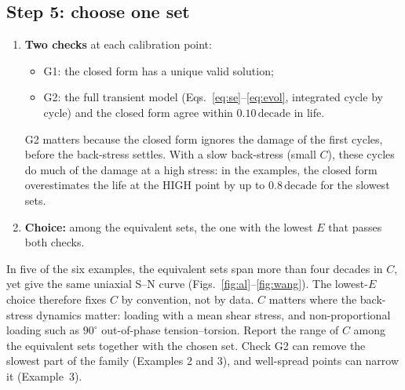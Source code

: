 \documentclass[11pt,a4paper]{article}
\newcommand{\dec}{\,\text{decade}}
\begin{document}
\subsection*{Step 5: choose one set}
\begin{enumerate}[label=(\alph*)]
\item \textbf{Two checks} at each calibration point:
  \begin{itemize}
  \item G1: the closed form has a unique valid solution;
  \item G2: the full transient model (Eqs.~\ref{eq:se}--\ref{eq:evol}, integrated cycle by cycle) and the closed form
    agree within $0.10\dec$ in life.
  \end{itemize}
  G2 matters because the closed form ignores the damage of the first cycles, before the back-stress settles. With a
  slow back-stress (small $C$), these cycles do much of the damage at a high stress: in the examples, the closed form
  overestimates the life at the HIGH point by up to $0.8\dec$ for the slowest sets.
\item \textbf{Choice:} among the equivalent sets, the one with the lowest $E$ that passes both checks.
\end{enumerate}

\begin{pitfall}
In five of the six examples, the equivalent sets span more than four decades in $C$, yet give the same uniaxial
S--N curve
(Figs.~\ref{fig:al}--\ref{fig:wang}). The lowest-$E$ choice therefore fixes $C$ by convention, not by data.
$C$ matters where the back-stress dynamics matter: loading with a mean shear stress, and non-proportional loading
such as $90^\circ$ out-of-phase tension--torsion. Report the range of $C$ among the equivalent sets together with the
chosen set. Check G2 can remove the slowest part of the family (Examples 2 and 3), and well-spread points can narrow
it (Example~3).
\end{pitfall}

\FloatBarrier
\end{document}
